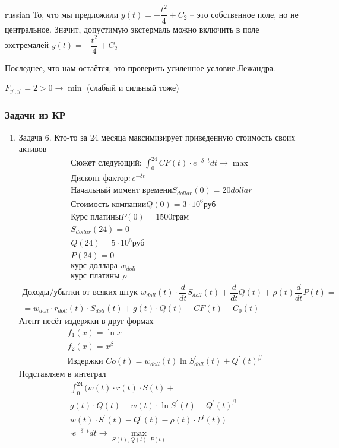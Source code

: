 \documentclass{article}
\begin{document}
\begin{otherlanguage*}{russian}
То, что мы предложили $ y(t) = - \dfrac{t^2}{4} + C_2 $ -- это собственное поле, но не центральное. Значит, допустимую экстермаль можно включить в поле экстремалей $y(t) = - \dfrac{t^2}{4} + C_2 $ 

Последнее, что нам остаётся, это проверить усиленное условие Лежандра. 

$ F_{y^{'}, y^{'}} = 2 > 0 \rightarrow \min $ (слабый и сильный тоже)  
\subsubsection*{Задачи из КР}
\begin{enumerate}
\item Задача 6. 
Кто-то за 24 месяца максимизирует приведенную стоимость своих активов
\begin{align*}
\text{Сюжет следующий: } \int_0^{24} CF(t) \cdot e ^{-\delta \cdot t} dt \rightarrow \max \\
\text{Дисконт фактор} : e^{- \delta t} \\
\text{Начальный момент времени} S_{dollar} (0) = 20 dollar \\
\text{Стоимость компании} Q(0) = 3 \cdot 10^6 \text{руб} \\
\text{Курс платины} P(0) = 1500 \text{грам} \\
S_{dollar} (24 ) = 0 \\ 
Q(24) = 5 \cdot 10^6 \text{руб} \\
P(24) = 0 \\
\text{курс доллара  } w_{doll} \\
\text{курс платины  } \rho 
\end{align*}
\begin{align*}
\text{Доходы/убытки от всяких штук  }  w_{doll} (t) \cdot \dfrac{d}{dt } S_{doll} (t) + \dfrac{d}{dt} Q(t) + \rho (t) \dfrac{d}{dt} P(t) =\\
=  w_{doll} \cdot r_{doll} (t) \cdot S_{doll} (t) + g(t) \cdot Q(t) - CF(t) - C_0 (t) 
\end{align*}
Агент несёт издержки в друг формах 
\begin{align*}
& f_1 (x) = \ln x \\
& f_2 (x) = x^{\beta} \\
& \text{Издержки   } Co(t) = w_{doll} (t) \ln S^{'}_{doll} (t) + Q^{'} (t)^\beta 
\end{align*}
Подставляем в интеграл 
\begin{align*}
\int_0^24 (w (t) \cdot r(t) \cdot S(t) + &\\ g(t) \cdot Q(t)  - w(t) \cdot \ln S^{'} (t) - Q^{'} (t) ^ \beta - & \\ w(t) \cdot S^{'} (t) - Q^{'} (t) - \rho (t) \cdot P^{'} (t) )\\ \cdot e ^ {- \delta \cdot t} dt \rightarrow \max _{S(t) , Q(t), P(t)} 

\end{align*}
\end{enumerate}
\end{otherlanguage*}
\end{document}
